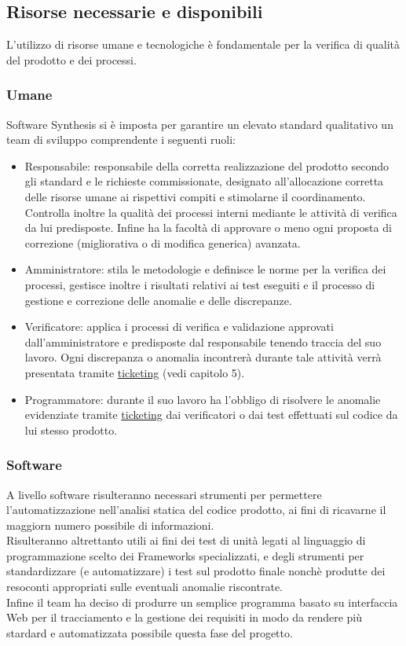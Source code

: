 \subsection{Risorse necessarie e disponibili}
L'utilizzo di risorse umane e tecnologiche è fondamentale per la verifica di qualità del prodotto e dei processi. 
\subsubsection{Umane}
Software Synthesis si è imposta per garantire un elevato standard qualitativo un team di sviluppo comprendente i seguenti ruoli:
\begin{itemize}
\item Responsabile: responsabile della corretta realizzazione del prodotto secondo gli standard e le richieste commissionate, designato all'allocazione corretta delle risorse umane ai rispettivi compiti e stimolarne il coordinamento. 
Controlla inoltre la qualità dei processi interni mediante le attività di verifica da lui predisposte. Infine ha la facoltà di approvare o meno ogni proposta di correzione (migliorativa o di modifica generica) avanzata.
\item Amministratore: stila le metodologie e definisce le norme per la verifica dei processi, gestisce inoltre i risultati relativi ai test eseguiti e il processo di gestione e correzione delle anomalie e delle discrepanze.
\item Verificatore: applica i processi di verifica e validazione approvati dall'amministratore e predisposte dal responsabile tenendo traccia del suo lavoro. Ogni discrepanza o anomalia incontrerà durante tale attività verrà presentata tramite \underline{ticketing} (vedi capitolo 5).
\item Programmatore: durante il suo lavoro ha l'obbligo di risolvere le anomalie evidenziate tramite \underline{ticketing} dai verificatori o dai test effettuati sul codice da lui stesso prodotto.
\end{itemize}
\subsubsection{Software}
A livello software risulteranno necessari strumenti per permettere l'automatizzazione nell'analisi statica del codice prodotto, ai fini di ricavarne il maggiorn numero possibile di informazioni.\\
Risulteranno altrettanto utili ai fini dei test di unità legati al linguaggio di programmazione scelto dei Frameworks specializzati, e degli strumenti per standardizzare (e automatizzare) i test sul prodotto finale nonchè produtte dei resoconti appropriati sulle eventuali anomalie riscontrate.\\
Infine il team ha deciso di produrre un semplice programma basato su interfaccia Web per il tracciamento e la gestione dei requisiti in modo da rendere più stardard e automatizzata possibile questa fase del progetto.
